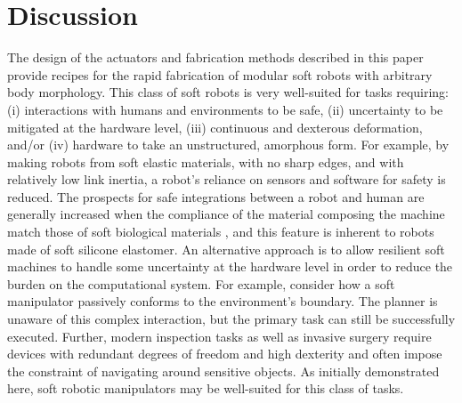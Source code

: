 \section{Discussion}
\label{sec:discussion}
The design of the actuators and fabrication methods described in this paper provide recipes for the rapid fabrication of modular soft robots with arbitrary body morphology.
%
This class of soft robots is very well-suited for tasks requiring: (i) interactions with humans and environments to be safe, (ii) uncertainty to be mitigated at the hardware level, (iii) continuous and dexterous deformation, and/or (iv) hardware to take an unstructured, amorphous form.
%
For example, by making robots from soft elastic materials, with no sharp edges, and with relatively low link inertia, a robot's reliance on sensors and software for safety is reduced.
%
The prospects for safe integrations between a robot and human are generally increased when the compliance of the material composing the machine match those of soft biological materials \citet{majidi2014soft}, and this feature is inherent to robots made of soft silicone elastomer.
%
An alternative approach is to allow resilient soft machines to handle some uncertainty at the hardware level in order to reduce the burden on the computational system.
%
For example, consider how a soft manipulator passively conforms to the environment's boundary. The planner is unaware of this complex interaction, but the primary task can still be successfully executed.
%
Further, modern inspection tasks as well as invasive surgery require devices with redundant degrees of freedom and high dexterity and often impose the constraint of navigating around sensitive objects.
%
As initially demonstrated here, soft robotic manipulators may be well-suited for this class of tasks.




